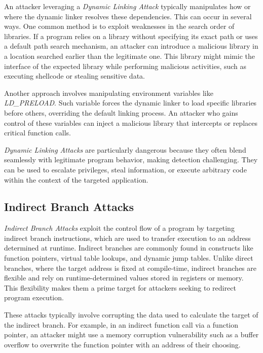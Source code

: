 An attacker leveraging a \textit{Dynamic Linking Attack} typically manipulates how
or where the dynamic linker resolves these dependencies. This can occur in
several ways. One common method is to exploit weaknesses in the search order of libraries.
If a program relies on a library without specifying its exact path or uses a
default path search mechanism, an attacker can introduce a malicious library in a
location searched earlier than the legitimate one. This library might mimic the
interface of the expected library while performing malicious activities, such as
executing shellcode or stealing sensitive data.

Another approach involves manipulating environment variables like \textit{LD\_PRELOAD}.
Such variable forces the dynamic linker to load specific libraries before others,
overriding the default linking process. An attacker who gains control of these variables
can inject a malicious library that intercepts or replaces critical function calls.

\textit{Dynamic Linking Attacks} are particularly dangerous because they often
blend seamlessly with legitimate program behavior, making detection challenging.
They can be used to escalate privileges, steal information, or execute arbitrary
code within the context of the targeted application.

\subsection{Indirect Branch Attacks}
\label{subsec:background_indirectbranch}

\textit{Indirect Branch Attacks} exploit the control flow of a program by
targeting indirect branch instructions, which are used to transfer execution to an
address determined at runtime. Indirect branches are commonly found in
constructs like function pointers, virtual table lookups, and dynamic jump
tables. Unlike direct branches, where the target address is fixed at compile-time,
indirect branches are flexible and rely on runtime-determined values stored in registers
or memory. This flexibility makes them a prime target for attackers seeking to
redirect program execution.

These attacks typically involve corrupting the data used to calculate the target
of the indirect branch. For example, in an indirect function call via a function
pointer, an attacker might use a memory corruption vulnerability such as a buffer
overflow to overwrite the function pointer with an address of their choosing.


